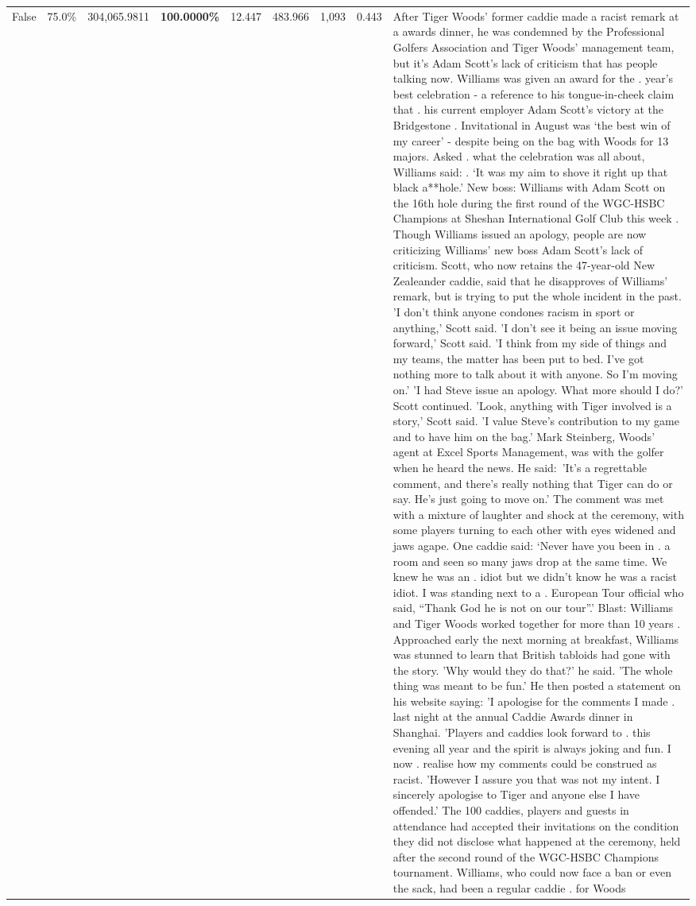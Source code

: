 \begin{table}[H]
\begin{tabular}{lllrlllll}
False & 75.0\% & \color{red} 304,065.9811 & \bfseries \color{red} 100.0000\% & 12.447 & 483.966 & 1,093 & 0.443 & After Tiger Woods' former caddie made a racist remark at a awards dinner, he was condemned by the Professional Golfers Association and Tiger Woods' management team, but it's Adam Scott's lack of criticism that has people talking now. Williams was given an award for the . year’s best celebration - a reference to his tongue-in-cheek claim that . his current employer Adam Scott’s victory at the Bridgestone . Invitational in August was ‘the best win of my career’ - despite being on the bag with Woods for 13 majors. Asked . what the celebration was all about, Williams said: . ‘It was my aim to shove it right up that black a**hole.’ New boss: Williams with Adam Scott  on the 16th hole during the first round of the WGC-HSBC Champions at Sheshan International Golf Club this week . Though Williams issued an apology, people are now criticizing Williams' new boss Adam Scott's lack of criticism. Scott, who now retains the 47-year-old New Zealeander caddie, said that he disapproves of Williams' remark, but is trying to put the whole incident in the past. 'I don't think anyone condones racism in sport or anything,' Scott said. 'I don't see it being an issue moving forward,' Scott said. 'I think from my side of things and my teams, the matter has been put to bed. I've got nothing more to talk about it with anyone. So I'm moving on.' 'I had Steve issue an apology. What more should I do?' Scott continued. 'Look, anything with Tiger involved is a story,' Scott said. 'I value Steve's contribution to my game and to have him on the bag.' Mark Steinberg, Woods' agent at Excel Sports Management, was with the golfer when he heard the news. He said: 'It's a regrettable comment, and there's really nothing that Tiger can do or say. He's just going to move on.' The comment was met with a mixture of laughter and shock at the ceremony, with some players turning to each other with eyes widened and jaws agape. One caddie said: ‘Never have you been in . a room and seen so many jaws drop at the same time. We knew he was an . idiot but we didn’t know he was a racist idiot. I was standing next to a . European Tour official who said, “Thank God he is not on our tour”.’ Blast: Williams and Tiger Woods worked together for more than 10 years . Approached early the next morning at breakfast, Williams was stunned to learn that British tabloids had gone with the story. 'Why would they do that?' he said. 'The whole thing was meant to be fun.' He then posted a statement on his website saying: 'I apologise for the comments I made . last night at the annual Caddie Awards dinner in Shanghai. 'Players and caddies look forward to . this evening all year and the spirit is always joking and fun. I now . realise how my comments could be construed as racist. 'However I assure you that was not my intent. I sincerely apologise to Tiger and anyone else I have offended.' The 100 caddies, players and guests in attendance had accepted their invitations on the condition they did not disclose what happened at the ceremony, held after the second round of the WGC-HSBC Champions tournament. Williams, who could now face a ban or even the sack, had been a regular caddie . for Woods 
\end{tabular}
\end{table}
